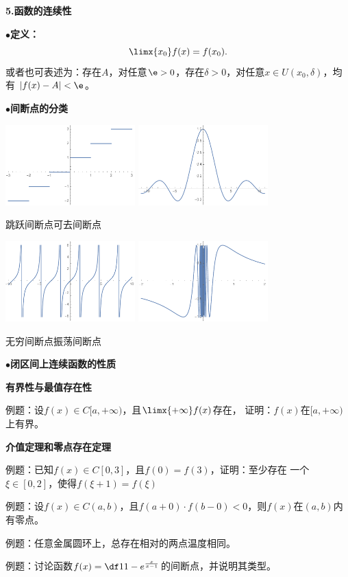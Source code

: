 {\bf 5.函数的连续性}

$\bullet${\bf 定义：}
$$\limx{x_0}f(x)=f(x_0).$$
或者也可表述为：存在$A$，对任意$\e>0$，存在$\delta>0$，对任意$x\in U(x_0,\delta)$，均有
$|f(x)-A|<\e$。

$\bullet${\bf 间断点的分类}

\begin{center}
	\includegraphics[width=5cm]{./images/ch01/roundx.pdf}\quad
	\includegraphics[width=5cm]{./images/ch01/sinxox.pdf}
	
	跳跃间断点\hspace{4cm}可去间断点
	
	\includegraphics[width=5cm]{./images/ch01/tanx.pdf}\quad
	\includegraphics[width=5cm]{./images/ch01/sin1ox.pdf}
	
	无穷间断点\hspace{4cm}振荡间断点
\end{center}

$\bullet${\bf 闭区间上连续函数的性质}

{\bf 有界性与最值存在性}

例题：设$f(x)\in C[a,+\infty)$，且$\limx{+\infty}f(x)$存在，
证明：$f(x)$在$[a,+\infty)$上有界。

{\bf 介值定理和零点存在定理}

例题：已知$f(x)\in C[0,3]$，且$f(0)=f(3)$，证明：至少存在
一个$\xi\in[0,2]$，使得$f(\xi+1)=f(\xi)$

例题：设$f(x)\in C(a,b)$，且$f(a+0)\cdot f(b-0)<0$，则$f(x)$在$(a,b)$内有零点。

例题：任意金属圆环上，总存在相对的两点温度相同。

例题：讨论函数$f(x)=\df1{1-e^{\frac{x}{x-1}}}$的间断点，并说明其类型。

\fin

\fi